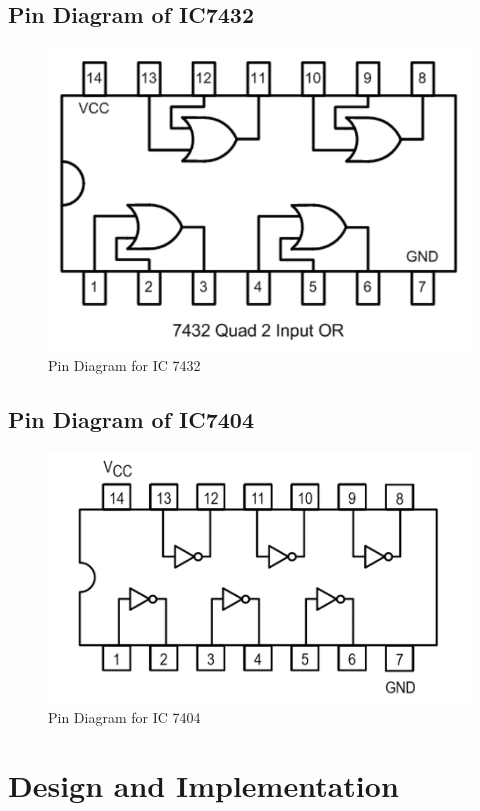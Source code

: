\documentclass[11pt]{article}
\begin{document}
\subsection{Pin Diagram of IC7432}
\begin{figure}[H]
	\centering
	\includegraphics[scale = 0.6]{7432.png}
	\caption{Pin Diagram for IC 7432}
\end{figure}
\subsection{Pin Diagram of IC7404}
\begin{figure}[H]
	\centering
	\includegraphics[scale = 0.8]{7404.png}
	\caption{Pin Diagram for IC 7404}
\end{figure}

\section{Design and Implementation}
\end{document}
